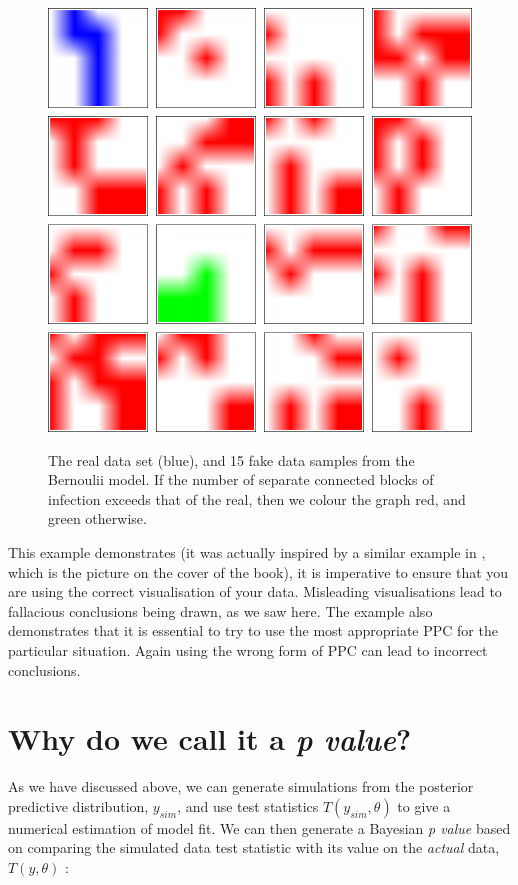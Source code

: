 \documentclass[11pt,fullpage]{book}
\begin{document}
\begin{figure}
\centering
\scalebox{0.8} 
{\includegraphics{Evaluation_bateriaPPCArray.pdf}}
\caption{The real data set (blue), and 15 fake data samples from the Bernoulii model. If the number of separate connected blocks of infection exceeds that of the real, then we colour the graph red, and green otherwise.}\label{fig:Evaluation_bateriaPPCArray}
\end{figure}


This example demonstrates (it was actually inspired by a similar example in \cite{gelman2013bayesian}, which is the picture on the cover of the book), it is imperative to ensure that you are using the correct visualisation of your data. Misleading visualisations lead to fallacious conclusions being drawn, as we saw here. The example also demonstrates that it is essential to try to use the most appropriate PPC for the particular situation. Again using the wrong form of PPC can lead to incorrect conclusions. 

\section{Why do we call it a \textit{p value}?}
As we have discussed above, we can generate simulations from the posterior predictive distribution, $y_{sim}$, and use test statistics $T(y_{sim},\theta)$ to give a numerical estimation of model fit. We can then generate a Bayesian \textit{p value} based on comparing the simulated data test statistic with its value on the \textit{actual} data, $T(y,\theta)$ \cite{gelman2013bayesian}:
\end{document}
